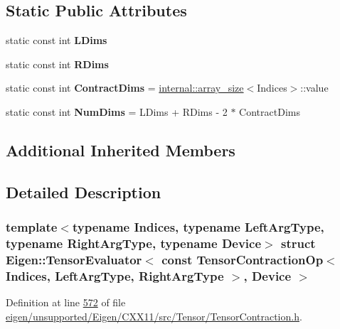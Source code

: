 \subsection*{Static Public Attributes}
\begin{DoxyCompactItemize}
\item 
static const int {\bfseries L\+Dims}
\item 
static const int {\bfseries R\+Dims}
\item 
\mbox{\label{struct_eigen_1_1_tensor_evaluator_3_01const_01_tensor_contraction_op_3_01_indices_00_01_left_arg1f297d3eabde0efec8e4d9b1aa9abe5a_aa69757479742cdf50215610df875f218}} 
static const int {\bfseries Contract\+Dims} = \hyperlink{struct_eigen_1_1internal_1_1array__size}{internal\+::array\+\_\+size}$<$Indices$>$\+::value
\item 
\mbox{\label{struct_eigen_1_1_tensor_evaluator_3_01const_01_tensor_contraction_op_3_01_indices_00_01_left_arg1f297d3eabde0efec8e4d9b1aa9abe5a_a3d547237d347e9a5a7e245a1778e4bb5}} 
static const int {\bfseries Num\+Dims} = L\+Dims + R\+Dims -\/ 2 $\ast$ Contract\+Dims
\end{DoxyCompactItemize}
\subsection*{Additional Inherited Members}


\subsection{Detailed Description}
\subsubsection*{template$<$typename Indices, typename Left\+Arg\+Type, typename Right\+Arg\+Type, typename Device$>$\newline
struct Eigen\+::\+Tensor\+Evaluator$<$ const Tensor\+Contraction\+Op$<$ Indices, Left\+Arg\+Type, Right\+Arg\+Type $>$, Device $>$}



Definition at line \hyperlink{eigen_2unsupported_2_eigen_2_c_x_x11_2src_2_tensor_2_tensor_contraction_8h_source_l00572}{572} of file \hyperlink{eigen_2unsupported_2_eigen_2_c_x_x11_2src_2_tensor_2_tensor_contraction_8h_source}{eigen/unsupported/\+Eigen/\+C\+X\+X11/src/\+Tensor/\+Tensor\+Contraction.\+h}.



